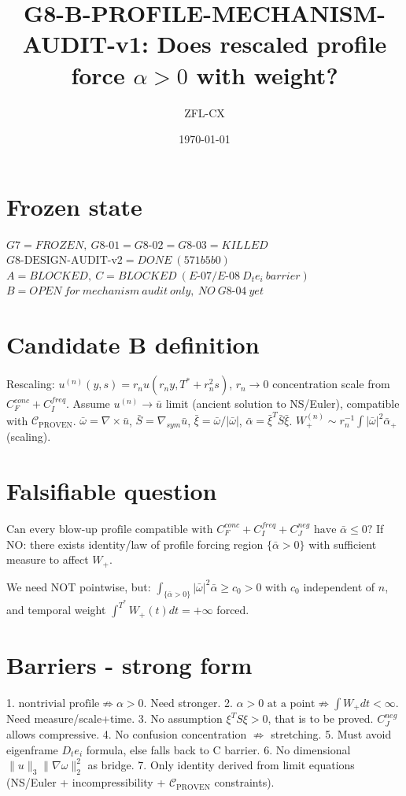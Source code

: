 \documentclass[11pt]{article}
\begin{document}
\title{G8-B-PROFILE-MECHANISM-AUDIT-v1: Does rescaled profile force $\alpha>0$ with weight?}
\author{ZFL-CX}\date{\today}\maketitle

\section{Frozen state}
$\boxed{G7=FROZEN,\ G8\text{-}01=G8\text{-}02=G8\text{-}03=KILLED}$
$\boxed{G8\text{-DESIGN-AUDIT-v2}=DONE\ (571b5b0)}$
$\boxed{A= BLOCKED,\ C= BLOCKED\ (E\text{-}07/E\text{-}08\ D_te_i\ barrier)}$
$\boxed{B=OPEN\ for\ mechanism\ audit\ only,\ NO\ G8\text{-}04\ yet}$

\section{Candidate B definition}
Rescaling: $u^{(n)}(y,s)=r_nu(r_ny,T^*+r_n^2s)$, $r_n\to0$ concentration scale from $C_F^{conc}+C_I^{freq}$.
Assume $u^{(n)}\to\bar u$ limit (ancient solution to NS/Euler), compatible with $\mathcal C_{\mathrm{PROVEN}}$.
$\bar\omega=\nabla\times\bar u$, $\bar S=\nabla_{sym}\bar u$, $\bar\xi=\bar\omega/|\bar\omega|$, $\bar\alpha=\bar\xi^T\bar S\bar\xi$.
$W^{(n)}_+\sim r_n^{-1}\int|\bar\omega|^2\bar\alpha_+$ (scaling).

\section{Falsifiable question}
$\boxed{\text{Can every blow-up profile compatible with }C_F^{conc}+C_I^{freq}+C_J^{neg}\text{ have }\bar\alpha\le0?}$
If NO: there exists identity/law of profile forcing region $\{\bar\alpha>0\}$ with sufficient measure to affect $W_+$.

We need NOT pointwise, but:
$\boxed{\int_{\{\bar\alpha>0\}}|\bar\omega|^2\bar\alpha\ge c_0>0}$ with $c_0$ independent of $n$, and temporal weight $\int^{T^*}W_+(t)dt=+\infty$ forced.

\section{Barriers - strong form}
1. $\boxed{\text{nontrivial profile}\not\Rightarrow\alpha>0}$. Need stronger.
2. $\boxed{\alpha>0\text{ at a point}\not\Rightarrow\int W_+dt<\infty}$. Need measure/scale+time.
3. No assumption $\xi^TS\xi>0$, that is to be proved. $C_J^{neg}$ allows compressive.
4. No confusion concentration $\not\Rightarrow$ stretching.
5. Must avoid eigenframe $D_te_i$ formula, else falls back to C barrier.
6. No dimensional $\|u\|_3\|\nabla\omega\|_2^2$ as bridge.
7. Only identity derived from limit equations (NS/Euler + incompressibility + $\mathcal C_{\mathrm{PROVEN}}$ constraints).
\end{document}
